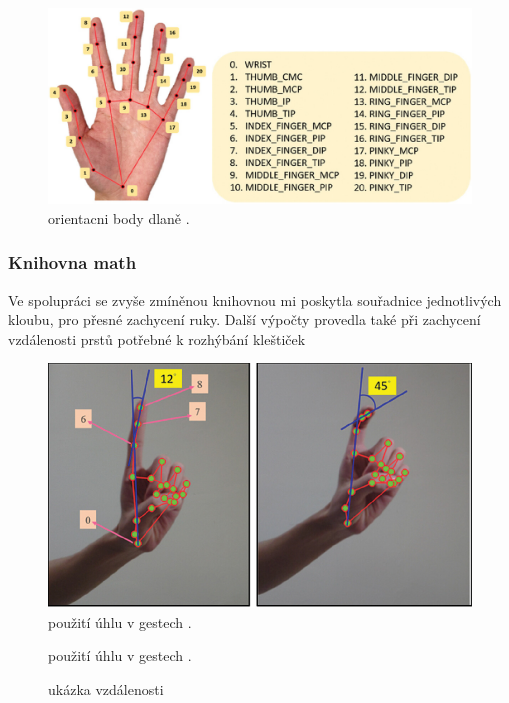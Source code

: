 \documentclass[12pt, a4paper,
twoside,        %
openright
]{report}
\begin{document}
{\begin{figure}[h]
	\centering
	\includegraphics[width=0.8\linewidth]{image/orientacniBody.jpg} 
	
	
	\caption{orientacni body dlaně \cite{orientacni body dlaně}.} %
	\label{fig:obvod} %
\end{figure}

\subsubsection{Knihovna math}

Ve spolupráci se zvyše zmíněnou knihovnou mi poskytla souřadnice jednotlivých kloubu, pro přesné zachycení ruky. 
Další výpočty provedla také při zachycení vzdálenosti prstů potřebné k rozhýbání kleštiček

\begin{figure}[h]
	
	\centering
	\includegraphics[width=0.4\linewidth]{image/prikladGesta.PNG} 
	
	
	\caption{použití úhlu v gestech \cite{uhly v gestech}.} %
	\label{fig:uhlyVGestech} %
\end{figure}

\begin{figure}
	\centering
{}

		\caption{použití úhlu v gestech \cite{uhly v gestech}.}
	\qquad
	\caption{ukázka vzdálenosti}
	\label{fig:vzdalenost}
\end{figure}

}
\end{document}
